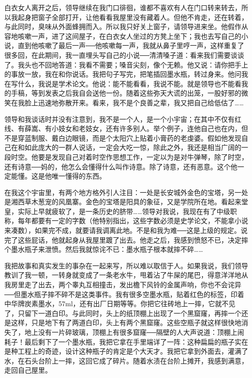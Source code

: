 白衣女人离开之后，领导继续在我门口徘徊，谁都不喜欢有人在门口转来转去，所以我起身把窗子全部打开，让他看看我屋里没有藏着人。但他不肯走，还在转着，与此同时，臭味从外面蜂拥而入。所以我只好关上窗子，请领导进来坐。他假作从容地咳嗽一声，进了这间屋子，在白衣女人坐过的方凳上坐下；我也去写自己的小说，直到他咳嗽了最后一声──他咳嗽每一声，我就从鼻子里哼一声，这样重复了很多回，在此期间，我一直埋头写自己的小说──清清嗓子道：看来我们需要谈谈了。我头也不回地答道：我看不需要；嗓音尖刻，像个无赖。他又说：请你把手上的事放一放，我在和你说话。我把句子写完，把笔插回墨水瓶，转过身来。他问我在写什么，我说是学术论文。他说：能不能看看，我说不能。就是领导也不能看我的手稿，等到发表之后我自会送他一份。随着这些弥天大谎的出笼，一股好邪的微笑在我脸上迅速地弥散开来。看来，我不是个良善之辈，我又把自己给低估了…… 

领导和我谈话时并没有注意到，我不是一个人，是一个小宇宙；在其中不仅有红线、有薛嵩、有小妓女和老妓女，还有许多别人。举个例子，连他自己也在内，但不是穿蓝制服、戴白边眼镜，而是个太阳穴上贴着小膏药的老虔婆。假如他发现自己在和如此庞大的一群人说话，一定会大吃一惊，除此之外，我还是相当广阔的一段时空。他要是发现自己对着时空作思想工作，一定以为是对牛弹琴，除了时空，还有诗意──妈的，他怎么会懂得什么叫作诗意。除了诗意，还有恶意。这个他一定能懂。这是他唯一懂得的东西。 

在我这个宇宙里，有两个地方格外引人注目：一处是长安城外金色的宝塔，另一处是湘西草木葱宠的风凰寨。金色的宝塔是阳具的象征，又是学院所在地。看起来堂皇，实际上早就疲软了，是一条历史的脐带……领导对我说，我现在有了中级职称，每年都要有一定的字数（他特别指出，这些字数必须是史学论文，不能拿小说来凑数），如果完不成，就要请我调离此地。不是和我为难──这是上级的规定。说完了这些屁话，他就起身从我屋里踱了出去。他走之后，我感到愤怒不已，决定摔个墨水瓶子来泄愤。然后我就惊诧不已：墨水瓶子根本就摔不碎…… 

我把故事和真实发生的事杂在一起来写，所以难以取信于人。如果我说，我们领导教训了我一顿，一转身就变成了一条老水牛，甩着沾了牛屎的尾巴，得意洋洋地从我房里走了出去，两个睾丸互相撞击，发出檐下风铃的金属声响，你也不会诧异──但墨水瓶子摔不碎不是这类事件。我有很多空墨水瓶，贴着红色的标签，印着中华牌炭素墨水，57ml，还有出厂日期等等。你把它往砖地上一摔，它就不见了，只留下一道白印。与此同时，头上的纸顶棚上出现了一个黑窟窿，再摔一个还是这样，只是地下有了两道白印，头上有两个黑窟窿。这些空瓶子就这样很快地消失了，地上没有一片碎玻璃，顶棚上有很多窟窿──隔壁的人大声说道：顶棚上闹耗子！最后剩下了一个墨水瓶，我把它拿在手里端详了一阵：这种扁扁的瓶子实在是种工程上的奇迹，设计这种瓶子的肯定是个大天才。我把它拿到外面去，灌满了水，在石头台阶上一摔，这回它成了碎片。随着水渍在台阶上摊开，我感到满意，走回自己屋里。 

